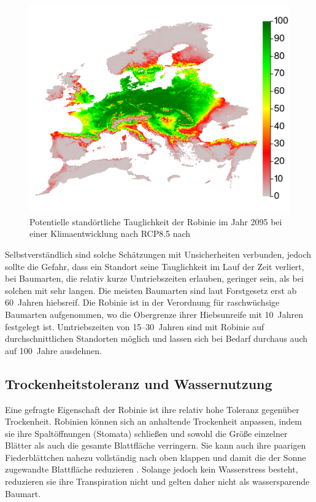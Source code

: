 \documentclass[twocolumn]{scrartcl}
\begin{document}
\begin{figure}[htbp]
  \centering
  \includegraphics[width=.9\linewidth]{./bild/potentialEuropaZukunft85}
  \caption{Potentielle standörtliche Tauglichkeit der Robinie im Jahr 2095 bei einer Klimaentwicklung nach RCP8.5 nach \citet{mauri2022baumartenZukunft}}
  \label{fig:verbreitungEuPotZukunft}
\end{figure}

Selbstverständlich sind solche Schätzungen mit Unsicherheiten verbunden, jedoch sollte die Gefahr, dass ein Standort seine Tauglichkeit im Lauf der Zeit verliert, bei Baumarten, die relativ kurze Umtriebszeiten erlauben, geringer sein, als bei solchen mit sehr langen. Die meisten Baumarten sind laut Forstgesetz erst ab 60~Jahren hiebsreif. Die Robinie ist in der Verordnung für raschwüchsige Baumarten aufgenommen, wo die Obergrenze ihrer Hiebsunreife mit 10~Jahren festgelegt ist. Umtriebszeiten von 15--30~Jahren sind mit Robinie auf durchschnittlichen Standorten möglich und lassen sich bei Bedarf durchaus auch auf 100~Jahre ausdehnen.

\subsection{Trockenheitstoleranz und Wassernutzung} %

Eine gefragte Eigenschaft der Robinie ist ihre relativ hohe Toleranz gegenüber Trockenheit. Robinien können sich an anhaltende Trockenheit anpassen, indem sie ihre Spaltöffnungen (Stomata) schließen und sowohl die Größe einzelner Blätter als auch die gesamte Blattfläche verringern. Sie kann auch ihre paarigen Fiederblättchen nahezu vollständig nach oben klappen und damit die der Sonne zugewandte Blattfläche reduzieren \citep{schildknecht1984blattbewegung}. Solange jedoch kein Wasserstress besteht, reduzieren sie ihre Transpiration nicht und gelten daher nicht als wassersparende Baumart.
\end{document}
